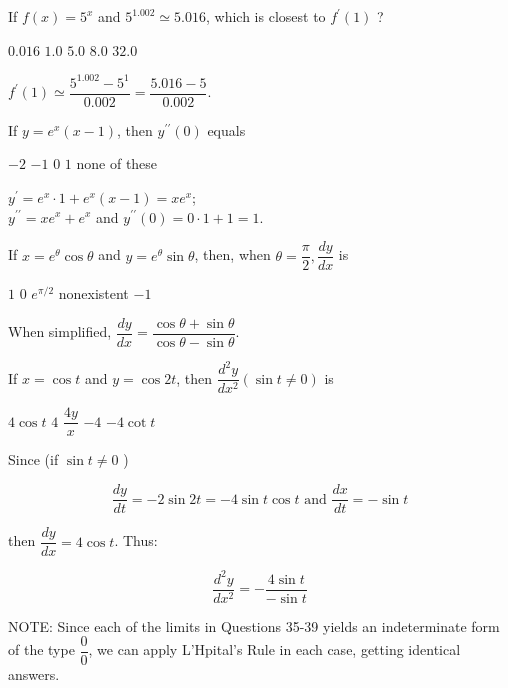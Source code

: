 \question
If $f(x)=5^{x}$ and $5^{1.002} \simeq 5.016$, which is closest to $f^{\prime}(1)$ ?
\begin{choices}
  \choice $0.016$
  \choice $1.0$
  \choice $5.0$
  \CorrectChoice $8.0$
  \choice $32.0$
\end{choices}
\begin{solution}
$f^{\prime}(1) \simeq \dfrac{5^{1.002}-5^{1}}{0.002}=\dfrac{5.016-5}{0.002}$.
\end{solution}

\question
If $y=e^{x}(x-1)$, then $y^{\prime \prime}(0)$ equals
\begin{choices}
  \choice $-2$
  \choice $-1$
  \choice $0$
  \CorrectChoice $1$
  \choice none of these
\end{choices}
\begin{solution}
$y^{\prime}=e^{x} \cdot 1+e^{x}(x-1)=x e^{x}$;\\
$y^{\prime \prime}=x e^{x}+e^{x}$ and $y^{\prime \prime}(0)=0 \cdot 1+1=1$.
\end{solution}




\newpage



\question
If $x=e^{\theta} \cos \theta$ and $y=e^{\theta} \sin \theta$, then, when $\theta=\dfrac{\pi}{2}, \dfrac{d y}{d x}$ is
\begin{choices}
  \choice $1$
  \choice $0$
  \choice $e^{\pi / 2}$
  \choice nonexistent
  \CorrectChoice $-1$
\end{choices}
\begin{solution}
When simplified, $\dfrac{d y}{d x}=\dfrac{\cos \theta+\sin \theta}{\cos \theta-\sin \theta}$.
\end{solution}

\question
If $x=\cos t$ and $y=\cos 2 t$, then $\dfrac{d^{2} y}{d x^{2}}(\sin t \neq 0)$ is
\begin{choices}
  \choice $4 \cos t$
  \CorrectChoice $4$
  \choice $\dfrac{4 y}{x}$
  \choice $-4$
  \choice $-4 \cot t$
\end{choices}
\begin{solution}
Since (if $\sin t \neq 0$ )


\[
\dfrac{d y}{d t}=-2 \sin 2 t=-4 \sin t \cos t \text { and } \dfrac{d x}{d t}=-\sin t
\]

then $\dfrac{d y}{d x}=4 \cos t$. Thus:

\[
\dfrac{d^{2} y}{d x^{2}}=-\dfrac{4 \sin t}{-\sin t}
\]

NOTE: Since each of the limits in Questions 35-39 yields an indeterminate form of the type $\dfrac{0}{0}$, we can apply L'Hpital's Rule in each case, getting identical answers.
\end{solution}

